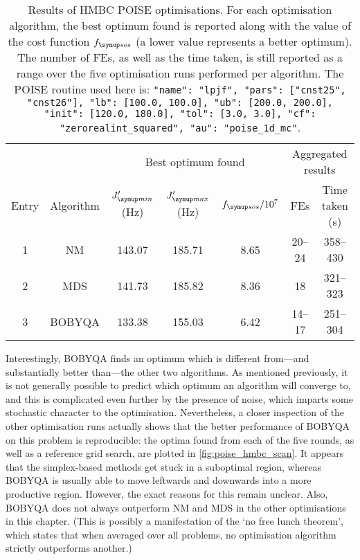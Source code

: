 \begin{table}[htb]
    \centering
    \begin{tabular}{ccccccc}
        \toprule
              &           & \multicolumn{3}{c}{Best optimum found} & \multicolumn{2}{c}{Aggregated results} \\
        \cmidrule(lr){3-5} \cmidrule(lr){6-7}
        Entry & Algorithm & $\Jmin'$ (\unit{\Hz}) & $\Jmax'$ (\unit{\Hz}) & $\fsos / 10^7$ & FEs & Time taken (\unit{\s}) \\
        \midrule
        1     & NM        & 143.07 & 185.71                 & 8.65 & 20--24 & 358--430 \\
        2     & MDS       & 141.73 & 185.82                 & 8.36 & 18     & 321--323 \\
        3     & BOBYQA    & 133.38 & 155.03                 & 6.42 & 14--17 & 251--304 \\
        \bottomrule
    \end{tabular}
    \caption[HMBC low-pass J-filter optimisations]{
        Results of HMBC POISE optimisations.
        For each optimisation algorithm, the best optimum found is reported along with the value of the cost function $\fsos$ (a lower value represents a better optimum).
        The number of FEs, as well as the time taken, is still reported as a range over the five optimisation runs performed per algorithm.
        The POISE routine used here is: \texttt{{"name": "lpjf", "pars": ["cnst25", "cnst26"], "lb": [100.0, 100.0], "ub": [200.0, 200.0], "init": [120.0, 180.0], "tol": [3.0, 3.0], "cf": "zerorealint_squared", "au": "poise_1d_mc"}}.
    }
    \label{tbl:poise_hmbc}
\end{table}

Interestingly, BOBYQA finds an optimum which is different from---and substantially better than---the other two algorithms.
As mentioned previously, it is not generally possible to predict which optimum an algorithm will converge to, and this is complicated even further by the presence of noise, which imparts some stochastic character to the optimisation.
Nevertheless, a closer inspection of the other optimisation runs actually shows that the better performance of BOBYQA on this problem is reproducible: the optima found from each of the five rounds, as well as a reference grid search, are plotted in \cref{fig:poise_hmbc_scan}.
It appears that the simplex-based methods get stuck in a suboptimal region, whereas BOBYQA is usually able to move leftwards and downwards into a more productive region.
However, the exact reasons for this remain unclear.
Also, BOBYQA does not always outperform NM and MDS in the other optimisations in this chapter.
(This is possibly a manifestation of the `no free lunch theorem'\autocite{Wolpert1997IEEETEC}, which states that when averaged over all problems, no optimisation algorithm strictly outperforms another.)

